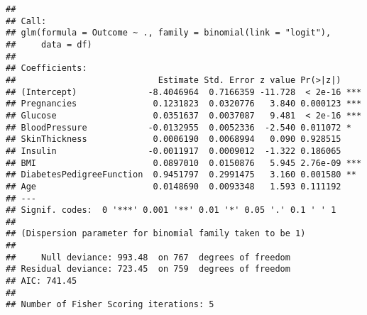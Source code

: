\documentclass[
]{article}
\newenvironment{Shaded}{\begin{snugshade}}{\end{snugshade}}
\newcommand{\AttributeTok}[1]{\textcolor[rgb]{0.13,0.29,0.53}{#1}}
\newcommand{\CommentTok}[1]{\textcolor[rgb]{0.56,0.35,0.01}{\textit{#1}}}
\newcommand{\DecValTok}[1]{\textcolor[rgb]{0.00,0.00,0.81}{#1}}
\newcommand{\FloatTok}[1]{\textcolor[rgb]{0.00,0.00,0.81}{#1}}
\newcommand{\FunctionTok}[1]{\textcolor[rgb]{0.13,0.29,0.53}{\textbf{#1}}}
\newcommand{\NormalTok}[1]{#1}
\newcommand{\OtherTok}[1]{\textcolor[rgb]{0.56,0.35,0.01}{#1}}
\newcommand{\SpecialCharTok}[1]{\textcolor[rgb]{0.81,0.36,0.00}{\textbf{#1}}}
\newcommand{\StringTok}[1]{\textcolor[rgb]{0.31,0.60,0.02}{#1}}
\begin{document}
\begin{verbatim}
## 
## Call:
## glm(formula = Outcome ~ ., family = binomial(link = "logit"), 
##     data = df)
## 
## Coefficients:
##                            Estimate Std. Error z value Pr(>|z|)    
## (Intercept)              -8.4046964  0.7166359 -11.728  < 2e-16 ***
## Pregnancies               0.1231823  0.0320776   3.840 0.000123 ***
## Glucose                   0.0351637  0.0037087   9.481  < 2e-16 ***
## BloodPressure            -0.0132955  0.0052336  -2.540 0.011072 *  
## SkinThickness             0.0006190  0.0068994   0.090 0.928515    
## Insulin                  -0.0011917  0.0009012  -1.322 0.186065    
## BMI                       0.0897010  0.0150876   5.945 2.76e-09 ***
## DiabetesPedigreeFunction  0.9451797  0.2991475   3.160 0.001580 ** 
## Age                       0.0148690  0.0093348   1.593 0.111192    
## ---
## Signif. codes:  0 '***' 0.001 '**' 0.01 '*' 0.05 '.' 0.1 ' ' 1
## 
## (Dispersion parameter for binomial family taken to be 1)
## 
##     Null deviance: 993.48  on 767  degrees of freedom
## Residual deviance: 723.45  on 759  degrees of freedom
## AIC: 741.45
## 
## Number of Fisher Scoring iterations: 5
\end{verbatim}

\begin{Shaded}
\end{Shaded}
\end{document}
